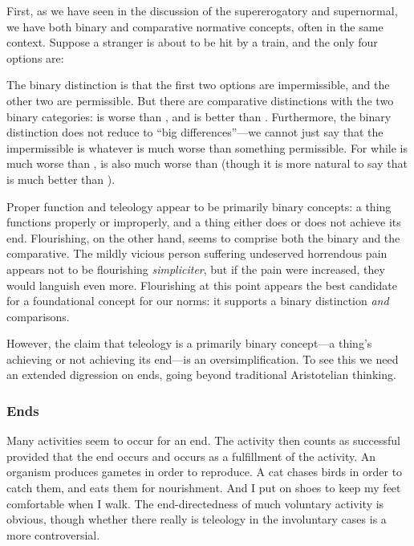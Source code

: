 First, as we have seen in the discussion of the supererogatory and supernormal, we have both binary and comparative normative 
concepts, often in the same context. Suppose a stranger is about to be hit by a train, and the only four options are:


The binary distinction is that
the first two options are impermissible, and the other two are permissible. But there are comparative distinctions
with the two binary categories:  is worse than , and  is better than . 
Furthermore, the binary distinction does 
not reduce to ``big differences''---we cannot just say that the impermissible is whatever is much worse than 
something permissible. For while  is much worse than ,  is also much worse than  (though 
it is more natural to say that  is much better than ). 

Proper function and teleology appear to be primarily binary concepts: a thing functions properly or improperly, and a thing either 
does or does not achieve its end. Flourishing, on the other hand, seems to comprise both the binary and the comparative. The mildly vicious person suffering undeserved horrendous pain appears not to be flourishing \textit{simpliciter}, but if the pain 
were increased,
they would languish even more. Flourishing at this point appears the best candidate for a foundational concept for our norms: it supports a binary distinction \textit{and} comparisons.

However, the claim that teleology is a primarily binary concept---a thing's achieving or not achieving its end---is
an oversimplification. To see this we need an extended digression on ends, going beyond traditional Aristotelian
thinking.

\subsubsection{Ends}
Many activities seem to occur for an end. The activity then counts as successful provided that the end occurs and occurs as a
fulfillment of the activity. An organism produces gametes in order to reproduce. A cat chases birds in order to catch them,
and eats them for nourishment. And I put on shoes to keep my feet comfortable when I walk. The end-directedness of much voluntary
activity is obvious, though whether there really is teleology in the involuntary cases is a more controversial.

